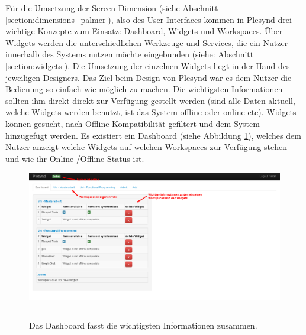 Für die Umsetzung der Screen-Dimension (siehe Abschnitt \ref{section:dimensions_palmer}), also des User-Interfaces kommen in Plesynd drei wichtige Konzepte zum Einsatz: Dashboard, Widgets und Workspaces. Über Widgets werden die unterschiedlichen Werkzeuge und Services, die ein Nutzer innerhalb des Systems nutzen möchte eingebunden (siehe: Abschnitt \ref{section:widgets}). Die Umsetzung der einzelnen Widgets liegt in der Hand des jeweiligen Designers. Das Ziel beim Design von Plesynd war es dem Nutzer die Bedienung so einfach wie möglich zu machen. Die wichtigsten Informationen sollten ihm direkt direkt zur Verfügung gestellt werden (sind alle Daten aktuell, welche Widgets werden benutzt, ist das System offline oder online etc). Widgets können gesucht, nach Offline-Kompatibilität gefiltert und dem System hinzugefügt werden. Es existiert ein Dashboard (siehe Abbildung \ref{fig:plesynd_dashboard}), welches dem Nutzer anzeigt welche Widgets auf welchen Workspaces zur Verfügung stehen und wie ihr Online-/Offline-Status ist.
\begin{figure}
  \centering
  \includegraphics[width=\textwidth,height=\textheight,keepaspectratio]{./Figures/plesynd_dashboard.png}
    \rule{35em}{0.5pt}
  \caption[Plesynd User-Interface: Dashboard]{Das Dashboard fasst die wichtigsten Informationen zusammen.}
  \label{fig:plesynd_dashboard}
\end{figure}

